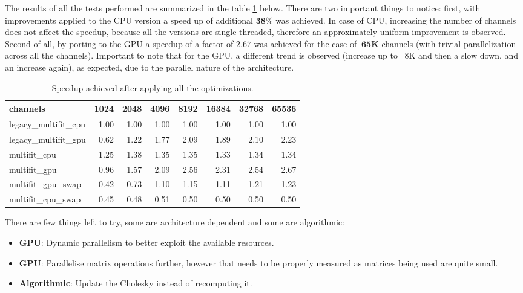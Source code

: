 The results of all the tests performed are summarized in the table \ref{tab:speedup} below. There are two important things to notice: first, with improvements applied to the CPU version a speed up of additional $\bm{38\%}$ was achieved. In case of CPU, increasing the number of channels does not affect the speedup, because all the versions are single threaded, therefore an approximately uniform improvement is observed. Second of all, by porting to the GPU a speedup of a factor of $\bm{2.67}$ was achieved for the case of $\bm{~65K}$ channels (with trivial parallelization across all the channels). Important to note that for the GPU, a different trend is observed (increase up to ~8K and then a slow down, and an increase again), as expected, due to the parallel nature of the architecture.

\begin{table}[H]
  \caption{Speedup achieved after applying all the optimizations.}
  \label{tab:speedup}
\begin{tabular}{lrrrrrrr}
\toprule
channels &  1024  &  2048  &  4096  &  8192  &  16384 &  32768 &  65536 \\
\midrule
legacy\_multifit\_cpu &   1.00 &   1.00 &   1.00 &   1.00 &   1.00 &   1.00 &   1.00 \\
legacy\_multifit\_gpu &   0.62 &   1.22 &   1.77 &   2.09 &   1.89 &   2.10 &   2.23 \\
multifit\_cpu        &   1.25 &   1.38 &   1.35 &   1.35 &   1.33 &   1.34 &   1.34 \\
multifit\_gpu        &   0.96 &   1.57 &   2.09 &   2.56 &   2.31 &   2.54 &   2.67 \\
multifit\_gpu\_swap   &   0.42 &   0.73 &   1.10 &   1.15 &   1.11 &   1.21 &   1.23 \\
multifit\_cpu\_swap   &   0.45 &   0.48 &   0.51 &   0.50 &   0.50 &   0.50 &   0.50 \\
\bottomrule
\end{tabular}
\end{table}
There are few things left to try, some are architecture dependent and some are algorithmic:
\begin{itemize}
  \item \textbf{GPU}: Dynamic parallelism to better exploit the available resources.
  \item \textbf{GPU}: Parallelise matrix operations further, however that needs to be properly measured as matrices being used are quite small.
  \item \textbf{Algorithmic}: Update the Cholesky instead of recomputing it.

\end{itemize}